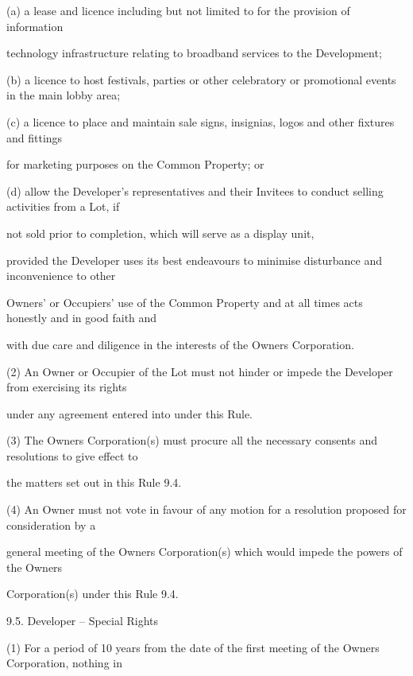 \documentclass{article}
\begin{document}
{\fontsize{9.962}{1}(a) a lease and licence including but not limited to for the provision of information }

{\fontsize{10.02}{1}technology infrastructure relating to broadband services to the Development; }

{\fontsize{9.962}{1}(b) a licence to host festivals, parties or other celebratory or promotional events in the main lobby area; }

{\fontsize{9.962}{1}(c) a licence to place and maintain sale signs, insignias, logos and other fixtures and fittings }

{\fontsize{10.02}{1}for marketing purposes on the Common Property; or }

\newpage

{\fontsize{9.962}{1}(d) allow the Developer's representatives and their Invitees to conduct selling activities from a Lot, if }

{\fontsize{10.02}{1}not sold prior to completion, which will serve as a display unit, }

{\fontsize{10.02}{1}provided the Developer uses its best endeavours to minimise disturbance and inconvenience to other }

{\fontsize{10.02}{1}Owners' or Occupiers' use of the Common Property and at all times acts honestly and in good faith and }

{\fontsize{10.02}{1}with due care and diligence in the interests of the Owners Corporation. }

{\fontsize{9.962}{1}(2) An Owner or Occupier of the Lot must not hinder or impede the Developer from exercising its rights }

{\fontsize{10.02}{1}under any agreement entered into under this Rule. }

{\fontsize{9.962}{1}(3) The Owners Corporation(s) must procure all the necessary consents and resolutions to give effect to }

{\fontsize{10.02}{1}the matters set out in this Rule 9.4. }

{\fontsize{9.962}{1}(4) An Owner must not vote in favour of any motion for a resolution proposed for consideration by a }

{\fontsize{10.02}{1}general meeting of the Owners Corporation(s) which would impede the powers of the Owners }

{\fontsize{10.02}{1}Corporation(s) under this Rule 9.4. }

{\fontsize{9.99}{1}9.5. Developer – Special Rights }

{\fontsize{9.962}{1}(1) For a period of 10 years from the date of the first meeting of the Owners Corporation, nothing in }
\end{document}
